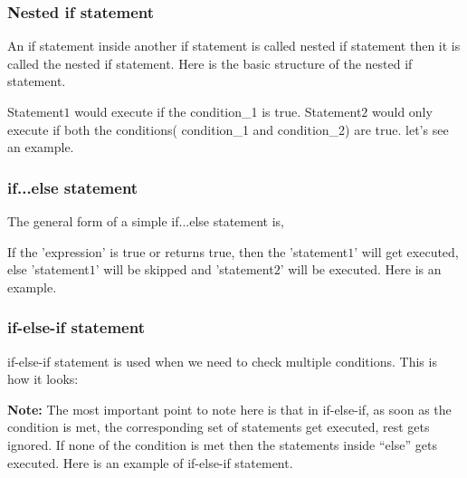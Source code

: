 \documentclass[11pt, a4paper]{article}
\begin{document}
\subsubsection{Nested if statement}
An if statement inside another if statement is called nested if statement then it is called
the nested if statement. Here is the basic structure of the nested if statement.

Statement$1$ would execute if the condition\_1 is true. Statement$2$ would only execute
if both the conditions( condition\_1 and condition\_2) are true. let's see an example.


\subsubsection{if...else statement}
The general form of a simple if...else statement is,

If the 'expression' is true or returns true, then the 'statement$1$' will get executed,
else 'statement$1$' will be skipped and 'statement$2$' will be executed. Here is an example.


\subsubsection{if-else-if statement}
if-else-if statement is used when we need to check multiple conditions. This is how it looks:

\textbf{Note:} The most important point to note here is that in if-else-if, as soon as the
condition is met, the corresponding set of statements get executed, rest gets ignored.
If none of the condition is met then the statements inside “else” gets executed.
Here is an example of if-else-if statement.

\end{document}
